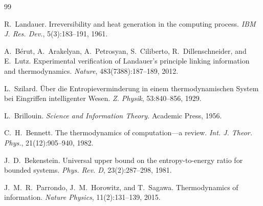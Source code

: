 \documentclass[12pt,a4paper]{article}
\theoremstyle{plain}
\theoremstyle{definition}
\begin{document}

\begin{thebibliography}{99}

R.~Landauer.
Irreversibility and heat generation in the computing process.
\textit{IBM J. Res. Dev.}, 5(3):183--191, 1961.

A.~B\'erut, A.~Arakelyan, A.~Petrosyan, S.~Ciliberto, R.~Dillenschneider, and E.~Lutz.
Experimental verification of Landauer's principle linking information and thermodynamics.
\textit{Nature}, 483(7388):187--189, 2012.

L.~Szilard.
\"Uber die Entropieverminderung in einem thermodynamischen System bei Eingriffen intelligenter Wesen.
\textit{Z. Physik}, 53:840--856, 1929.

L.~Brillouin.
\textit{Science and Information Theory.}
Academic Press, 1956.

C.~H.~Bennett.
The thermodynamics of computation---a review.
\textit{Int. J. Theor. Phys.}, 21(12):905--940, 1982.

J.~D.~Bekenstein.
Universal upper bound on the entropy-to-energy ratio for bounded systems.
\textit{Phys. Rev. D}, 23(2):287--298, 1981.

J.~M.~R.~Parrondo, J.~M.~Horowitz, and T.~Sagawa.
Thermodynamics of information.
\textit{Nature Physics}, 11(2):131--139, 2015.

\end{thebibliography}
\end{document}
